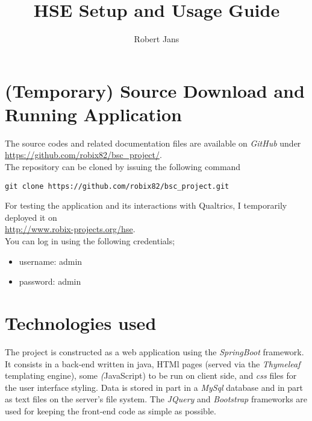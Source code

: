 \documentclass[fleqn]{article}
\title{HSE Setup and Usage Guide}
\author{Robert Jans}
\begin{document}
\setlength{\parindent}{0cm}

\maketitle

\newpage

\hypersetup{
  linkcolor=black
}
\tableofcontents
\hypersetup{
  linkcolor=blue
}

\newpage

\section{(Temporary) Source Download and Running Application}

The source codes and related documentation files are available on \emph{GitHub} under \\

\href{https://github.com/robix82/bsc_project/}{https://github.com/robix82/bsc\_project/}. \\

The repository can be cloned by issuing the following command 
\begin{verbatim}
git clone https://github.com/robix82/bsc_project.git
\end{verbatim}

For testing the application and its interactions with Qualtrics, I temporarily deployed it on \\

\url{http://www.robix-projects.org/hse}. \\


You can log in using the following credentials;

\begin{itemize}
\item username: admin
\item password: admin
\end{itemize}

\section{Technologies used}

The project is constructed as a web application using the \emph{SpringBoot} framework. It consists in 
a back-end written in java, HTMl pages (served via the \emph{Thymeleaf} templating engine), some
\emph(JavaScript) to be run on client side, and \emph{css} files for the user interface styling. 
Data is stored in part in a \emph{MySql} database and in part as text files
on the server's file system. The \emph{JQuery} and \emph{Bootstrap} frameworks are used for keeping the
front-end code as simple as possible.
\end{document}
